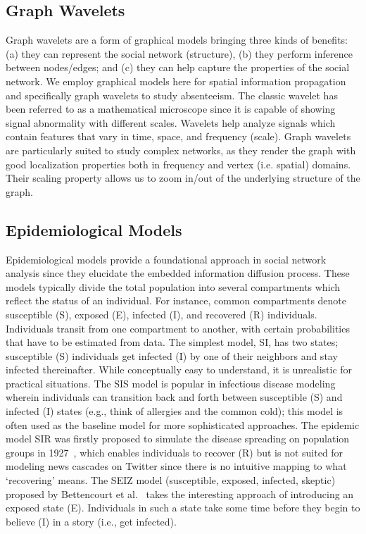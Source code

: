 \subsection{Graph Wavelets}
Graph wavelets are a form of graphical models bringing
three kinds of benefits: (a) they can
represent the social network (structure), (b) they
perform inference between nodes/edges; and (c) they can help
capture the properties of the social network. We employ graphical models here for spatial
information propagation and specifically graph wavelets to study absenteeism.
The classic wavelet has been referred
to as a mathematical microscope since it is capable of showing signal abnormality with
different scales. Wavelets help analyze signals which contain features that vary in time, space, and frequency (scale). Graph wavelets are particularly suited to study
complex networks, as they
render the graph with good localization properties both in frequency and vertex (i.e. spatial)
domains. Their scaling property allows us to zoom in/out of the underlying structure of the graph.

\subsection{Epidemiological Models}
Epidemiological models provide a foundational approach in social network analysis since they elucidate the embedded information diffusion process.
These models typically divide the total population into several compartments
which reflect the status of an individual. For instance, common compartments
denote susceptible (S), exposed (E), infected (I), and
recovered (R) individuals. Individuals transit from one compartment to another, with
certain probabilities that have to be estimated from data.
The simplest model, SI, has two states; susceptible (S) individuals get infected (I) by one of their neighbors and stay infected thereinafter. While conceptually easy to understand, it is unrealistic for practical situations.
The SIS model is popular in infectious disease modeling wherein individuals can transition back and forth between susceptible (S) and infected (I) states (e.g., think of allergies and
the common cold); this model is often used as the baseline model for more sophisticated approaches.
The epidemic model SIR was firstly proposed to simulate the disease spreading on population groups in 1927~\cite{kermack1927contribution}, which enables individuals to recover (R) but is not suited for modeling news cascades on Twitter since there is no intuitive mapping to what `recovering' means.
The SEIZ model (susceptible, exposed, infected, skeptic) proposed by Bettencourt et al.~\cite{powerofgoodidea:2006} takes the interesting approach of introducing an exposed state (E). Individuals in such a state take some time before they begin to believe (I)
in a story (i.e., get infected).

